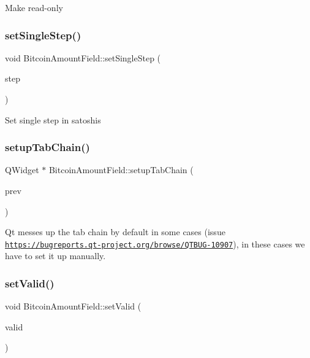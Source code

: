 Make read-\/only \mbox{\label{class_bitcoin_amount_field_a26ff92c23985e9ed79870311aed298c3}} 
\subsubsection{\texorpdfstring{set\+Single\+Step()}{setSingleStep()}}
{\footnotesize\ttfamily void Bitcoin\+Amount\+Field\+::set\+Single\+Step (\begin{DoxyParamCaption}\item[{const C\+Amount \&}]{step }\end{DoxyParamCaption})}

Set single step in satoshis \mbox{\label{class_bitcoin_amount_field_aa48f6950f46333c9e781880ecc279408}} 
\subsubsection{\texorpdfstring{setup\+Tab\+Chain()}{setupTabChain()}}
{\footnotesize\ttfamily Q\+Widget $\ast$ Bitcoin\+Amount\+Field\+::setup\+Tab\+Chain (\begin{DoxyParamCaption}\item[{Q\+Widget $\ast$}]{prev }\end{DoxyParamCaption})}

Qt messes up the tab chain by default in some cases (issue \href{https://bugreports.qt-project.org/browse/QTBUG-10907}{\tt https\+://bugreports.\+qt-\/project.\+org/browse/\+Q\+T\+B\+U\+G-\/10907}), in these cases we have to set it up manually. \mbox{\label{class_bitcoin_amount_field_ac4ca86e405804bad9689d74160e962de}} 
\subsubsection{\texorpdfstring{set\+Valid()}{setValid()}}
{\footnotesize\ttfamily void Bitcoin\+Amount\+Field\+::set\+Valid (\begin{DoxyParamCaption}\item[{bool}]{valid }\end{DoxyParamCaption})}

